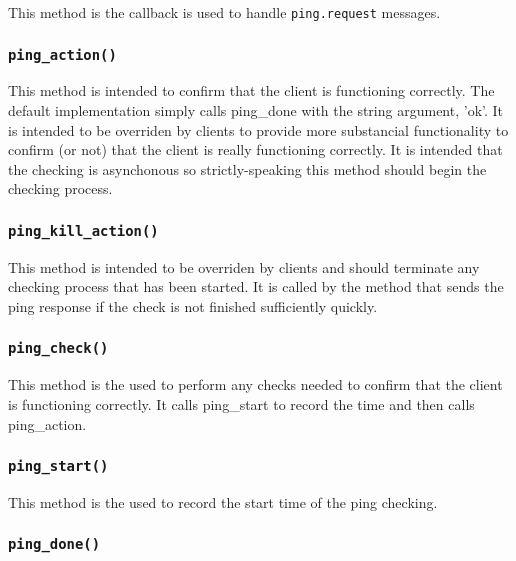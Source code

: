 This method is the callback is used to handle \texttt{ping.request} messages.

\subsubsection*{\texttt{ping\_action()}\label{xPL::Client_ping_action_}}


This method is intended to confirm that the client is functioning
correctly.  The default implementation simply calls \textsf{ping\_done} with
the string argument, 'ok'.  It is intended to be overriden by clients
to provide more substancial functionality to confirm (or not) that the
client is really functioning correctly.  It is intended that the
checking is asynchonous so strictly-speaking this method should begin
the checking process.

\subsubsection*{\texttt{ping\_kill\_action()}\label{xPL::Client_ping_kill_action_}}


This method is intended to be overriden by clients and should terminate
any checking process that has been started.  It is called by the method
that sends the ping response if the check is not finished sufficiently
quickly.

\subsubsection*{\texttt{ping\_check()}\label{xPL::Client_ping_check_}}


This method is the used to perform any checks needed to confirm that the
client is functioning correctly.  It calls \textsf{ping\_start} to record the
time and then calls \textsf{ping\_action}.

\subsubsection*{\texttt{ping\_start()}\label{xPL::Client_ping_start_}}


This method is the used to record the start time of the ping checking.

\subsubsection*{\texttt{ping\_done()}\label{xPL::Client_ping_done_}}


